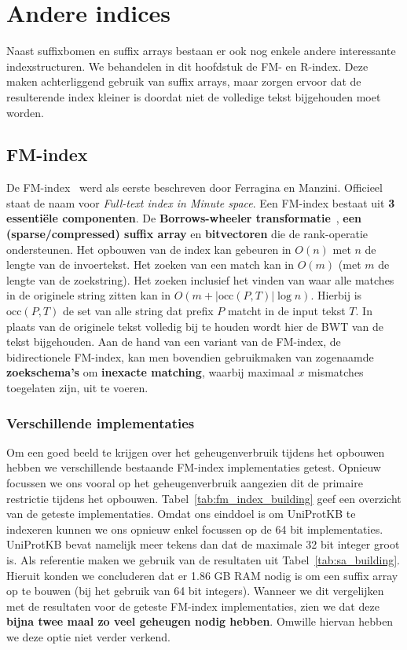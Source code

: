 \chapter{Andere indices}\label{ch:andere-indices}
Naast suffixbomen en suffix arrays bestaan er ook nog enkele andere interessante indexstructuren.
We behandelen in dit hoofdstuk de FM- en R-index.
Deze maken achterliggend gebruik van suffix arrays, maar zorgen ervoor dat de resulterende index kleiner is doordat niet de volledige tekst bijgehouden moet worden.


\section{FM-index}\label{sec:fm-index}
De FM-index~\cite{fm_index} werd als eerste beschreven door Ferragina en Manzini.
Officieel staat de naam voor \textit{Full-text index in Minute space}.
Een FM-index bestaat uit \textbf{3 essentiële componenten}.
De \textbf{Borrows-wheeler transformatie}~\cite{bwt}, \textbf{een (sparse/compressed) suffix array} en \textbf{bitvectoren} die de rank-operatie ondersteunen.
Het opbouwen van de index kan gebeuren in $O(n)$ met $n$ de lengte van de invoertekst.
Het zoeken van een match kan in $O(m)$ (met $m$ de lengte van de zoekstring).
Het zoeken inclusief het vinden van waar alle matches in de originele string zitten kan in $O(m + \text{|occ}(P, T)\text{|} \log n)$.
Hierbij is $\text{occ}(P, T)$ de set van alle string dat prefix $P$ matcht in de input tekst $T$.
In plaats van de originele tekst volledig bij te houden wordt hier de BWT van de tekst bijgehouden.
Aan de hand van een variant van de FM-index, de bidirectionele FM-index, kan men bovendien gebruikmaken van zogenaamde \textbf{zoekschema's} om \textbf{inexacte matching}, waarbij maximaal $x$ mismatches toegelaten zijn, uit te voeren.

\subsection{Verschillende implementaties}\label{subsec:verschillende-implementaties}
Om een goed beeld te krijgen over het geheugenverbruik tijdens het opbouwen hebben we verschillende bestaande FM-index implementaties getest.
Opnieuw focussen we ons vooral op het geheugenverbruik aangezien dit de primaire restrictie tijdens het opbouwen.
Tabel~\ref{tab:fm_index_building} geef een overzicht van de geteste implementaties.
Omdat ons einddoel is om UniProtKB te indexeren kunnen we ons opnieuw enkel focussen op de 64 bit implementaties.
UniProtKB bevat namelijk meer tekens dan dat de maximale 32 bit integer groot is.
Als referentie maken we gebruik van de resultaten uit Tabel~\ref{tab:sa_building}.
Hieruit konden we concluderen dat er 1.86 GB RAM nodig is om een suffix array op te bouwen (bij het gebruik van 64 bit integers).
Wanneer we dit vergelijken met de resultaten voor de geteste FM-index implementaties, zien we dat deze \textbf{bijna twee maal zo veel geheugen nodig hebben}.
Omwille hiervan hebben we deze optie niet verder verkend.

